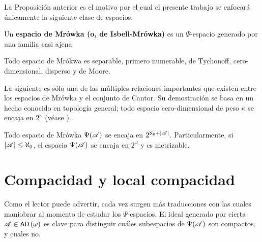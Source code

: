 	La Proposición anterior es el motivo por el cual el presente trabajo se enfocará únicamente la siguiente clase de espacios:

	\begin{definicion}
		Un \textbf{espacio de Mrówka (o, de Isbell-Mrówka)} es un $\Psi$-espacio generado por una familia casi ajena.
	\end{definicion}

	\begin{corolario}\label{cor-MrwokaSiempre}
		Todo espacio de Mrókwa es separable, primero numerable, de Tychonoff, cero-dimensional, disperso y de Moore.
	\end{corolario}

	La siguiente es sólo una de las múltiples relaciones importantes que existen entre los espacios de Mrówka y el conjunto de Cantor. Su demostración se basa en un hecho conocido en topología general; todo espacio cero-dimensional de peso $\kappa$ se encaja en $2^\kappa$ (véase \cite[Teo.~8.5.11, p.~299]{fidelElementos}).

	\begin{corolario}\label{cor-EncajeMrowkaCantor}
		Todo espacio de Mrówka $\Psi(\mathscr{A})$ se encaja en $2^{\aleph_0+|\mathscr{A}|}$. Particularmente, si $|\mathscr{A}|\leq \aleph_0$, el espacio $\Psi(\mathscr{A})$ se encaja en $2^\omega$ y es metrizable.
	\end{corolario}

	\section{Compacidad y local compacidad}

	Como el lector puede advertir, cada vez surgen más traducciones con las cuales maniobrar al momento de estudar los $\Psi$-espacios. El ideal generado por cierta $\mathscr{A} \in \operatorname{\text{\textsf{\small AD}}}\,(\omega)$ es clave para distinguir cuáles subespacios de $\Psi(\mathscr{A})$ son compactos, y cuales no. 
	
